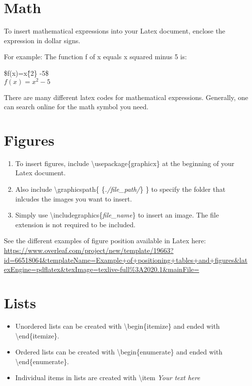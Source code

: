 \documentclass{article}
\begin{document}
\section*{Math}
\par To insert mathematical expressions into your Latex document, enclose the expression in dollar signs. \\
\par For example:
The function f of x equals x squared minus 5 is: \\
\begin{center}
\$f(x)=x\^\{2\} -5\$ \\
$f(x)=x^{2}-5$
\end{center}
\par There are many different latex codes for mathematical expressions. Generally, one can search online for the math symbol you need.

\section*{Figures}
\begin{enumerate}
    \item To insert figures, include \textbackslash usepackage\{graphicx\} at the beginning of your Latex document.
    \item Also include \textbackslash graphicspath\{ \{\textit{./file\_path/}\} \} to specify the folder that inlcudes the images you want to insert.
    \item Simply use \textbackslash includegraphics\{\textit{file\_name}\} to insert an image. The file extension is not required to be included.
\end{enumerate}
\par See the different examples of figure position available in Latex here: \\
\url{https://www.overleaf.com/project/new/template/19663?id=66518064&templateName=Example+of+positioning+tables+and+figures&latexEngine=pdflatex&texImage=texlive-full%3A2020.1&mainFile=}

\section*{Lists}
\begin{itemize}
    \item Unordered lists can be created with \textbackslash begin\{itemize\} and ended with \textbackslash end\{itemize\}.
    \item Ordered lists can be created with \textbackslash begin\{enumerate\} and ended with \textbackslash end\{enumerate\}.
    \item Individual items in lists are created with \textbackslash item \textit{Your text here}
\end{itemize}
\end{document}
